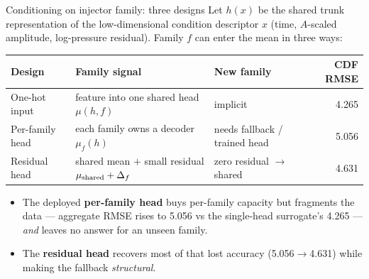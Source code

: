 \documentclass[UTF8,aspectratio=169]{ctexbeamer}
\newcommand{\good}[1]{\textcolor{green!45!black}{#1}}
\newcommand{\warn}[1]{\textcolor{red!65!black}{#1}}
\begin{document}
\begin{frame}{Conditioning on injector family: three designs}
\small
Let $h(x)$ be the shared trunk representation of the low-dimensional condition
descriptor $x$ (time, $A$-scaled amplitude, log-pressure residual). Family $f$ can
enter the mean in three ways:

\vspace{0.2em}
\begin{center}
\renewcommand{\arraystretch}{1.25}
\setlength{\tabcolsep}{4pt}
\begin{tabular}{@{}L{3.3cm}L{4.4cm}L{2.8cm}r@{}}
\toprule
\textbf{Design} & \textbf{Family signal} & \textbf{New family} & \textbf{CDF RMSE} \\
\midrule
One-hot input & feature into one shared head $\mu(h,f)$ & implicit & 4.265 \\
Per-family head & each family owns a decoder $\mu_f(h)$ & \warn{needs fallback / trained head} & 5.056 \\
Residual head & shared mean $+$ small residual $\mu_{\rm shared}+\Delta_f$ & \good{zero residual $\to$ shared} & 4.631 \\
\bottomrule
\end{tabular}
\end{center}

\vspace{0.15em}
\begin{itemize}\setlength\itemsep{1pt}
  \item The deployed \textbf{per-family head} buys per-family capacity but
        \warn{fragments the data} --- aggregate RMSE rises to 5.056 vs the
        single-head surrogate's 4.265 --- \emph{and} leaves no answer for an unseen family.
  \item The \textbf{residual head} recovers most of that lost accuracy
        \good{(5.056$\to$4.631)} while making the fallback \emph{structural}.
\end{itemize}
\end{frame}
\end{document}
